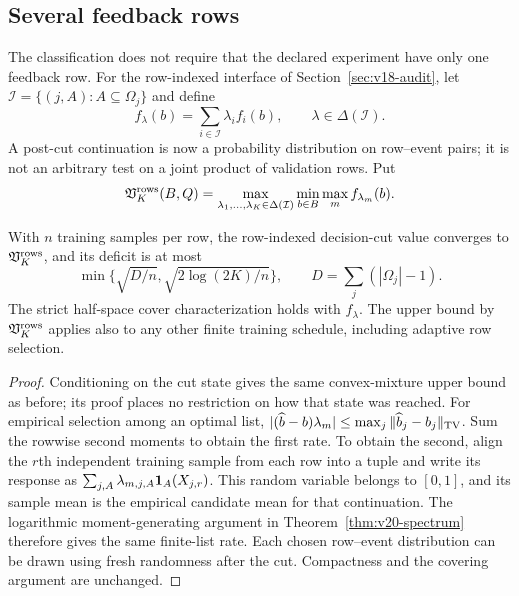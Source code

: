\subsection{Several feedback rows}
The classification does not require that the declared experiment have
only one feedback row. For the row-indexed interface of
Section~\ref{sec:v18-audit}, let
$\mathcal I=\{(j,A):A\subseteq\Omega_j\}$ and define
\[
 f_\lambda(b)=\sum_{i\in\mathcal I}\lambda_i f_i(b),
 \qquad \lambda\in\Delta(\mathcal I).
\]
A post-cut continuation is now a probability distribution on row--event
pairs; it is not an arbitrary test on a joint product of validation rows.
Put
\[
 \mathfrak V^{\rm rows}_K(B,Q)=
 \max_{\lambda_1,\ldots,\lambda_K\in\Delta(\mathcal I)}
       \min_{b\in B}\max_m f_{\lambda_m}(b).
\]
\begin{corollary}
\label{cor:v20-rows}
With $n$ training samples per row, the row-indexed decision-cut value
converges to $\mathfrak V^{\rm rows}_K$, and its deficit is at most
\[
 \min\{\sqrt{D/n},\sqrt{2\log(2K)/n}\},
 \qquad D=\sum_j(|\Omega_j|-1).
\]
The strict half-space cover characterization holds with $f_\lambda$.
The upper bound by $\mathfrak V^{\rm rows}_K$ applies also to any other
finite training schedule, including adaptive row selection.
\end{corollary}
\begin{proof}
Conditioning on the cut state gives the same convex-mixture upper bound
as before; its proof places no restriction on how that state was reached.
For empirical selection among an optimal list,
$|(\widehat b-b)\lambda_m|\le\max_j
\|\widehat b_j-b_j\|_{\rm TV}$. Sum the rowwise second moments to
obtain the first rate. To obtain the second, align the $r$th independent
training sample from each row into a tuple and write its response as
$\sum_{j,A}\lambda_{m,j,A}\mathbf 1_A(X_{j,r})$. This random variable belongs
to $[0,1]$, and its sample mean is the empirical candidate mean for that
continuation. The logarithmic moment-generating argument in
Theorem~\ref{thm:v20-spectrum} therefore gives the same finite-list rate.
Each chosen row--event distribution can be drawn using fresh randomness
after the cut. Compactness and the covering argument are unchanged.
\end{proof}
